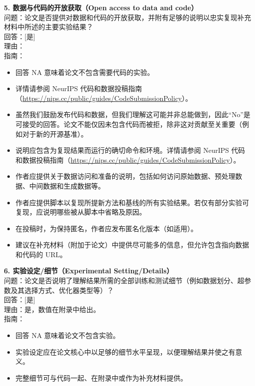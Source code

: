 \documentclass[11pt,UTF8,fontset=fandol]{ctexart}
\begin{document}
\textbf{5. 数据与代码的开放获取（Open access to data and code）}\\
问题：论文是否提供对数据和代码的开放获取，并附有足够的说明以忠实复现补充材料中所述的主要实验结果？\\
回答：[是]\\
理由：\\
指南：
\begin{itemize}[leftmargin=1.5em,itemsep=1pt]
\item 回答 NA 意味着论文不包含需要代码的实验。
\item 详情请参阅 NeurIPS 代码和数据投稿指南（\url{https://nips.cc/public/guides/CodeSubmissionPolicy}）。
\item 虽然我们鼓励发布代码和数据，但我们理解这可能并非总能做到，因此“No”是可接受的回答。论文不能仅因未包含代码而被拒，除非这对贡献至关重要（例如对于新的开源基准）。
\item 说明应包含为复现结果而运行的确切命令和环境。详情请参阅 NeurIPS 代码和数据投稿指南（\url{https://nips.cc/public/guides/CodeSubmissionPolicy}）。
\item 作者应提供关于数据访问和准备的说明，包括如何访问原始数据、预处理数据、中间数据和生成数据等。
\item 作者应提供脚本以复现所提新方法和基线的所有实验结果。若仅有部分实验可复现，应说明哪些被从脚本中省略及原因。
\item 在投稿时，为保持匿名，作者应发布匿名化版本（如适用）。
\item 建议在补充材料（附加于论文）中提供尽可能多的信息，但允许包含指向数据和代码的 URL。
\end{itemize}

\textbf{6. 实验设定/细节（Experimental Setting/Details）}\\
问题：论文是否说明了理解结果所需的全部训练和测试细节（例如数据划分、超参数及其选择方式、优化器类型等）？\\
回答：[是]\\
理由：是，数值在附录中给出。\\
指南：
\begin{itemize}[leftmargin=1.5em,itemsep=1pt]
\item 回答 NA 意味着论文不包含实验。
\item 实验设定应在论文核心中以足够的细节水平呈现，以便理解结果并使之有意义。
\item 完整细节可与代码一起、在附录中或作为补充材料提供。
\end{itemize}
\end{document}
